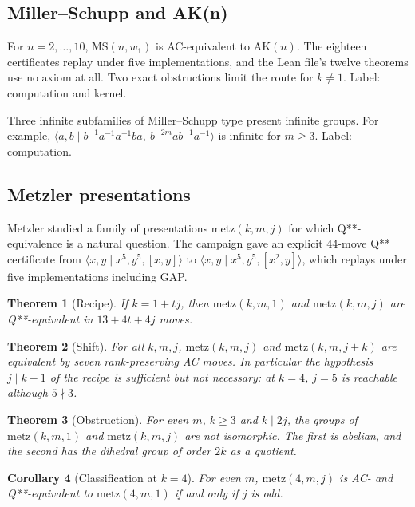 \documentclass[11pt,a4paper]{article}
\newtheorem{theorem}{Theorem}[section]
\newtheorem{corollary}[theorem]{Corollary}
\theoremstyle{definition}
\newcommand{\AK}{\mathrm{AK}}
\newcommand{\MS}{\mathrm{MS}}
\newcommand{\inv}[1]{#1^{-1}}
\begin{document}
\subsection{Miller--Schupp and AK(n)}

For $n=2,\dots,10$, $\MS(n,w_1)$ is AC-equivalent to $\AK(n)$. The eighteen certificates replay under five implementations, and the Lean file's twelve theorems use no axiom at all. Two exact obstructions limit the route for $k\ne1$. Label: computation and kernel.

Three infinite subfamilies of Miller--Schupp type present infinite groups. For example, $\langle a,b\mid \inv{b}\inv{a}\inv{a}ba,\ b^{-2m}a\inv{b}\inv{a}\rangle$ is infinite for $m\ge 3$. Label: computation.

\subsection{Metzler presentations}

Metzler \cite{Met21} studied a family of presentations $\mathrm{metz}(k,m,j)$ for which Q**-equivalence is a natural question. The campaign gave an explicit 44-move Q** certificate from $\langle x,y\mid x^5,y^5,[x,y]\rangle$ to $\langle x,y\mid x^5,y^5,[x^2,y]\rangle$, which replays under five implementations including GAP.

\begin{theorem}[Recipe]
If $k = 1+tj$, then $\mathrm{metz}(k,m,1)$ and $\mathrm{metz}(k,m,j)$ are Q**-equivalent in $13+4t+4j$ moves.
\end{theorem}

\begin{theorem}[Shift]
For all $k,m,j$, $\mathrm{metz}(k,m,j)$ and $\mathrm{metz}(k,m,j+k)$ are equivalent by seven rank-preserving AC moves. In particular the hypothesis $j\mid k-1$ of the recipe is sufficient but not necessary: at $k=4$, $j=5$ is reachable although $5\nmid 3$.
\end{theorem}

\begin{theorem}[Obstruction]
For even $m$, $k\ge3$ and $k\mid 2j$, the groups of $\mathrm{metz}(k,m,1)$ and $\mathrm{metz}(k,m,j)$ are not isomorphic. The first is abelian, and the second has the dihedral group of order $2k$ as a quotient.
\end{theorem}

\begin{corollary}[Classification at $k=4$]
For even $m$, $\mathrm{metz}(4,m,j)$ is AC- and Q**-equivalent to $\mathrm{metz}(4,m,1)$ if and only if $j$ is odd.
\end{corollary}
\end{document}
